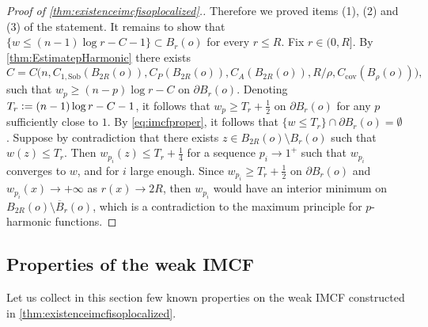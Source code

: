 \documentclass[a4paper,12pt,reqno]{amsart}
\numberwithin{equation}{section}
\theoremstyle{plain}
\theoremstyle{definition}
\theoremstyle{remark}
\newcommand{\eqdef}{\ensuremath{\vcentcolon=}}
\begin{document}
{\begin{proof}[Proof of \cref{thm:existenceimcfisoplocalized}.]
Therefore we proved items (1), (2) and (3) of the statement. 
It remains to show that $\{w \le (n-1)\log r - C-1\} \subset B_r(o)$ for every $r\leq R$. Fix $r\in (0,R]$. By \cref{thm:EstimatepHarmonic} there exists 
\[
C=C\big(n, C_{1, \mathrm{Sob}}(B_{2R}(o)), C_P(B_{2R}(o)), C_A(B_{2R}(o)), R/\rho, C_{\mathrm{cov}}(B_\rho(o))\big),
\] 
such that $w_p \ge (n-p) \log r - C$ on $\partial B_r(o)$. Denoting $T_r \eqdef (n-1) \log r - C -1$, it follows that $w_p \ge T_r + \tfrac12$ on $\partial B_r(o)$ for any $p$ sufficiently close to $1$. By \eqref{eq:imcfproper}, it follows that $\{ w \le T_r\} \cap  \partial B_r(o) = \emptyset$. Suppose by contradiction that there exists $z \in B_{2R}(o) \setminus B_r(o)$ such that $w(z) \le T_r$. Then $w_{p_i}(z) \le T_r+ \tfrac14$ for a sequence $p_i\to 1^+$ such that $w_{p_i}$ converges to $w$, and for $i$ large enough.
Since $w_{p_i} \ge T_r + \tfrac12$ on $\partial B_r(o)$ and $w_{p_i}(x)\to+\infty$ as $r(x)\to 2R$, then $w_{p_i}$ would have an interior minimum on $B_{2R}(o) \setminus \overline{B}_r(o)$, which is a contradiction to the maximum principle for $p$-harmonic functions. 
\end{proof}


\subsection{Properties of the weak IMCF}\label{rem:PropertiesOfFlow}

Let us collect in this section few known properties on the weak IMCF constructed in \cref{thm:existenceimcfisoplocalized}.

}
\end{document}
